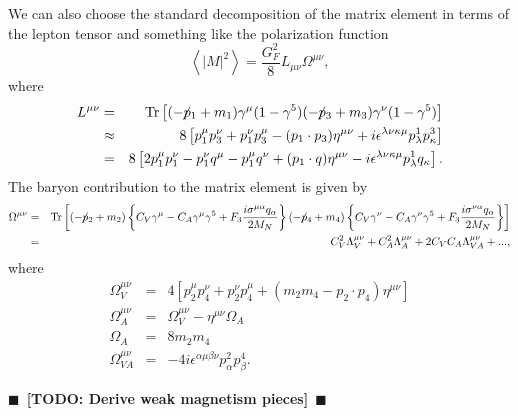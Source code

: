 \documentclass[12pt,letter]{article}
\newcommand{\fsl}[1]{\ensuremath{\mathrlap{\!\not{\phantom{#1}}}#1}}
\newcommand{\todo}[1]{{$\blacksquare$~\textbf{\color{blue}[TODO: #1]}}~$\blacksquare$}
\begin{document}
We can also choose the standard decomposition of the matrix element in terms of the lepton tensor and something like the polarization function 
\begin{equation*}
\left\langle \left| M \right|^2 \right \rangle = \frac{G_F^2}{8}
L_{\mu \nu} \Omega^{\mu \nu},
\end{equation*}
where 
\begin{eqnarray*}
L^{\mu \nu} &=& \textrm{Tr}\left[
(-\fsl{p}_1 + m_1) \gamma^\mu(1-\gamma^5) 
(-\fsl{p}_3 + m_3) \gamma^\nu(1-\gamma^5)  
\right] \\
&\approx& 8 \left[p_1^\mu p_3^\nu + p_1^\nu p_3^\mu 
- (p_1 \cdot p_3) \eta^{\mu \nu}   
+ i \epsilon^{\lambda \nu \kappa \mu} p_\lambda^1 p_\kappa^3
\right] \\
&=& 8 \left[2p_1^\mu p_1^\nu - p_1^\nu q^\mu - p_1^\mu q^\nu 
+ (p_1 \cdot q) \eta^{\mu \nu}   
- i \epsilon^{\lambda \nu \kappa \mu} p_\lambda^1 q_\kappa
\right].
\end{eqnarray*}
The baryon contribution to the matrix 
element is given by 
\begin{eqnarray*}
\Omega^{\mu \nu} &=& \textrm{Tr}\left[
(-\fsl{p}_2 + m_2) 
\left\{ C_V\gamma^\mu -C_A\gamma^\mu \gamma^5 
+ F_3\frac{i \sigma^{\mu \alpha}q_\alpha}{2 M_N} \right\}
(-\fsl{p}_4 + m_4)
\left \{ C_V\gamma^\nu -C_A\gamma^\nu \gamma^5 
+ F_3\frac{i \sigma^{\nu \alpha}q_\alpha}{2 M_N} \right\}
\right] \\
&=& C_V^2 \Lambda^{\mu \nu}_V + C_A^2 \Lambda^{\mu \nu}_A + 2 C_V C_A \Lambda^{\mu \nu}_{VA} + ..., 
\end{eqnarray*}
where 
\begin{eqnarray*}
\Omega_V^{\mu \nu} &=& 4 \left[
p_2^\mu p_4^\nu + p_2^\nu p_4^\mu + (m_2 m_4 - p_2 \cdot p_4) \eta^{\mu \nu}
\right] \\
\Omega_A^{\mu \nu} &=& \Omega_V^{\mu \nu} - \eta^{\mu \nu} \Omega_A \\
\Omega_A &=& 8 m_2 m_4 \\
\Omega_{VA}^{\mu \nu} &=& - 4i \epsilon^{\alpha \mu \beta \nu} 
p^2_\alpha p^4_\beta.
\end{eqnarray*}

\todo{Derive weak magnetism pieces}
\end{document}
